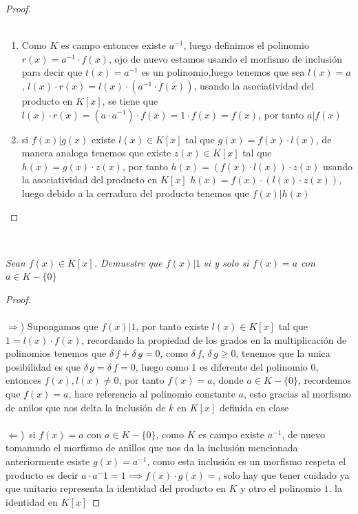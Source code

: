 \documentclass[11pt,letterpaper]{article}
\begin{document}
\begin{proof}\,\\
    \,\\
    \begin{enumerate}
        \item Como $K$ es campo entonces existe $a^{-1}$, luego definimos el polinomio $r(x)=a^{-1}\cdot f(x)$, ojo de nuevo estamos usando el morfismo de inclusi\'on
        para decir que $t(x)=a^{-1}$ es un polinomio,luego tenemos que sea $l(x)=a$, $l(x)\cdot r(x)=l(x)\cdot(a^{-1}\cdot f(x))$, usando la
        asociatividad del producto en $K[x]$, se tiene que $l(x)\cdot r(x)=(a\cdot a^{-1})\cdot f(x)=1\cdot f(x)=f(x)$, por tanto $a|f(x)$
        \item si $f(x)|g(x)$ existe $l(x)\in K[x]$ tal que $g(x)=f(x)\cdot l(x)$, de manera analoga tenemos que existe $z(x)\in K[x]$ tal que
        $h(x)=g(x)\cdot z(x)$, por tanto $h(x)=(f(x)\cdot l(x))\cdot z(x)$ usando la asociatividad del producto en $K[x]$ $h(x)=f(x)\cdot(l(x)\cdot z(x))$, luego
        debido a la cerradura del producto tenemos que $f(x)|h(x)$
    \end{enumerate}
\end{proof}\,\\
\begin{tcolorbox}[
	title = \textcolor{black}{\textcolor{white}{Problema 4}},]
\textit{Sean $f(x)\in K[x]$. Demuestre que $f(x)|1$ si y solo si $f(x)=a$ con $a\in K-\{0\}$
}
\end{tcolorbox}
\begin{proof}\,\\
    \,\\
    $\Rightarrow$) Supongamos que $f(x)|1$, por tanto existe $l(x)\in K[x]$ tal que $1=l(x)\cdot f(x)$, recordando
    la propiedad de los grados en la multiplicaci\'on de polinomios tenemos que $\delta\,f+\delta\,g=0$, como $\delta\,f,\,\delta\,g\geq 0$,
    tenemos que la unica posibilidad es que $\delta\,g=\delta\,f=0$, luego como $1$ es diferente del polinomio $0$, entonces $f(x),l(x)\neq 0$,
    por tanto $f(x)=a$, donde $a\in K-\{0\}$, recordemos que $f(x)=a$, hace referencia al polinomio constante $a$, esto gracias al morfismo de anilos que nos delta
    la inclusi\'on de $k$ en $K[x]$ definida en clase\,\\
    \,\\
    $\Leftarrow$)\, si $f(x)=a$ con $a\in K-\{0\}$, como $K$ es campo existe $a^{-1}$, de nuevo tomamndo el morfismo de anillos que nos da la inclusi\'on mencionada
    anteriormente esiste $g(x)=a^{-1}$, como esta inclusi\'on es un morfismo respeta el producto es decir $a\cdot a^-1=1\implies f(x)\cdot g(x)=$, solo hay que tener cuidado ya que unitario
    representa la identidad del producto en $K$ y otro el polinomio $1$. la identidad en $K[x]$
\end{proof}\,\\
\end{document}

